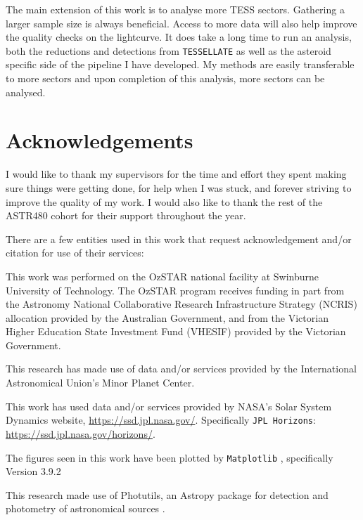 \documentclass{UCreport}
\begin{document}
The main extension of this work is to analyse more TESS sectors. 
Gathering a larger sample size is always beneficial. 
Access to more data will also help improve the quality checks on the lightcurve. 
It does take a long time to run an analysis, both the reductions and detections from \texttt{TESSELLATE} as well as the asteroid specific side of the pipeline I have developed.   
My methods are easily transferable to more sectors and upon completion of this analysis, more sectors can be analysed. 

\newpage %

\section*{Acknowledgements}

I would like to thank my supervisors for the time and effort they spent making sure things were getting done, for help when I was stuck, and forever striving to improve the quality of my work. 
I would also like to thank the rest of the ASTR480 cohort for their support throughout the year. 

There are a few entities used in this work that request acknowledgement and/or citation for use of their services:

This work was performed on the OzSTAR national facility at Swinburne University of Technology.
The OzSTAR program receives funding in part from the Astronomy National Collaborative Research Infrastructure Strategy (NCRIS) allocation provided by the Australian Government, and from the Victorian Higher Education State Investment Fund (VHESIF) provided by the Victorian Government.

This research has made use of data and/or services provided by the International Astronomical Union's Minor Planet Center.

This work has used data and/or services provided by NASA's Solar System Dynamics website, \url{https://ssd.jpl.nasa.gov/}. Specifically \texttt{JPL Horizons}: \url{https://ssd.jpl.nasa.gov/horizons/}.

The figures seen in this work have been plotted by \texttt{Matplotlib} \citep{Hunter2007}, specifically Version 3.9.2 \citep{PLT3.9.2}

This research made use of Photutils, an Astropy package for detection and photometry of astronomical sources \citep{Bradley2024}.
\end{document}
